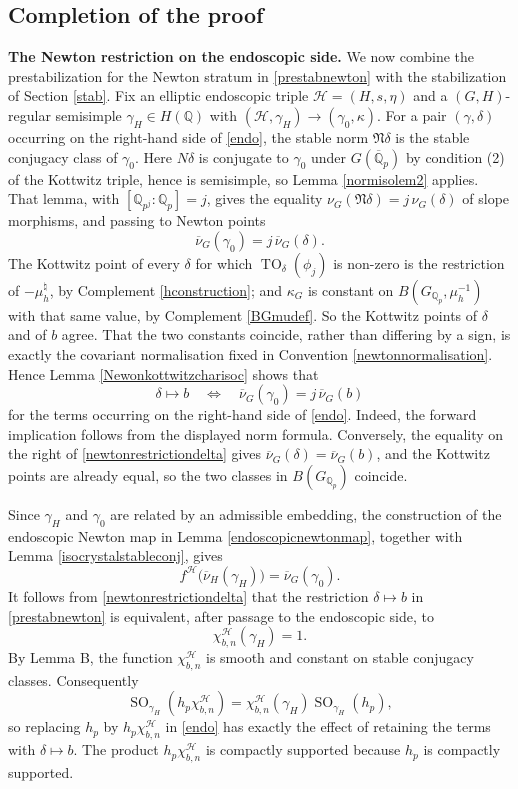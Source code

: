 \documentclass[11pt,a4paper]{article}
\theoremstyle{definition}
\theoremstyle{plain}
\theoremstyle{remark}
\theoremstyle{plain}
\DeclareMathOperator{\TO}{TO}
\DeclareMathOperator{\SO}{SO}
\begin{document}
\subsection{Completion of the proof}\label{completionmainproof}

\textbf{The Newton restriction on the endoscopic side.}
We now combine the prestabilization for the Newton stratum in \eqref{prestabnewton} with the stabilization of Section \ref{stab}. Fix an elliptic endoscopic triple $\mathcal H=(H,s,\eta)$ and a $(G,H)$-regular semisimple $\gamma_H\in H(\mathbb{Q})$ with $(\mathcal H,\gamma_H)\to(\gamma_0,\kappa)$. For a pair $(\gamma,\delta)$ occurring on the right-hand side of \eqref{endo}, the stable norm $\mathfrak N\delta$ is the stable conjugacy class of $\gamma_0$. Here $N\delta$ is conjugate to $\gamma_0$ under $G(\overline{\mathbb{Q}}_p)$ by condition (2) of the Kottwitz triple, hence is semisimple, so Lemma \ref{normisolem2} applies. That lemma, with $[\mathbb{Q}_{p^j}:\mathbb{Q}_p]=j$, gives the equality $\nu_G(\mathfrak N \delta) = j\,\nu_G(\delta)$ of slope morphisms, and passing to Newton points
$$
    \overline\nu_G(\gamma_0)=j\,\overline\nu_G(\delta).
$$
The Kottwitz point of every $\delta$ for which $\TO_\delta(\phi_j)$ is non-zero is the restriction of $-\mu_h^{\natural}$, by Complement \ref{hconstruction}; and $\kappa_G$ is constant on $B(G_{\mathbb{Q}_p},\mu_h^{-1})$ with that same value, by Complement \ref{BGmudef}. So the Kottwitz points of $\delta$ and of $b$ agree. That the two constants coincide, rather than differing by a sign, is exactly the covariant normalisation fixed in Convention \ref{newtonnormalisation}. Hence Lemma \ref{Newonkottwitzcharisoc} shows that
\begin{equation}\label{newtonrestrictiondelta}
    \delta\mapsto b
    \quad\Longleftrightarrow\quad
    \overline\nu_G(\gamma_0)=j\,\overline\nu_G(b)
\end{equation}
for the terms occurring on the right-hand side of \eqref{endo}. Indeed, the forward implication follows from the displayed norm formula. Conversely, the equality on the right of \eqref{newtonrestrictiondelta} gives $\overline\nu_G(\delta)=\overline\nu_G(b)$, and the Kottwitz points are already equal, so the two classes in $B(G_{\mathbb{Q}_p})$ coincide.

Since $\gamma_H$ and $\gamma_0$ are related by an admissible embedding, the construction of the endoscopic Newton map in Lemma \ref{endoscopicnewtonmap}, together with Lemma \ref{isocrystalstableconj}, gives
$$
    f^{\mathcal H}\bigl(\overline\nu_H(\gamma_H)\bigr)
    =\overline\nu_G(\gamma_0).
$$
It follows from \eqref{newtonrestrictiondelta} that the restriction $\delta\mapsto b$ in \eqref{prestabnewton} is equivalent, after passage to the endoscopic side, to
$$
    \chi_{b,n}^{\mathcal H}(\gamma_H)=1.
$$
By Lemma B, the function $\chi_{b,n}^{\mathcal H}$ is smooth and constant on stable conjugacy classes. Consequently
$$
    \SO_{\gamma_H}(h_p\chi_{b,n}^{\mathcal H})
    =\chi_{b,n}^{\mathcal H}(\gamma_H)\SO_{\gamma_H}(h_p),
$$
so replacing $h_p$ by $h_p\chi_{b,n}^{\mathcal H}$ in \eqref{endo} has exactly the effect of retaining the terms with $\delta\mapsto b$. The product $h_p\chi_{b,n}^{\mathcal H}$ is compactly supported because $h_p$ is compactly supported.
\end{document}
